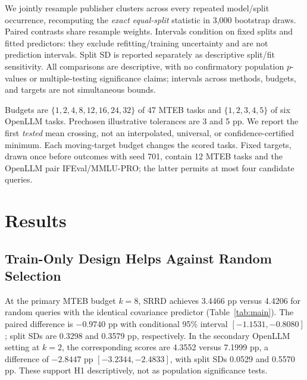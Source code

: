 \documentclass{article}
\begin{document}
We jointly resample publisher clusters across every repeated model/split occurrence, recomputing the \emph{exact equal-split} statistic in 3,000 bootstrap draws. Paired contrasts share resample weights. Intervals condition on fixed splits and fitted predictors: they exclude refitting/training uncertainty and are not prediction intervals. Split SD is reported separately as descriptive split/fit sensitivity. All comparisons are descriptive, with no confirmatory population $p$-values or multiple-testing significance claims; intervals across methods, budgets, and targets are not simultaneous bounds.

Budgets are $\{1,2,4,8,12,16,24,32\}$ of 47 MTEB tasks and $\{1,2,3,4,5\}$ of six OpenLLM tasks. Prechosen illustrative tolerances are 3 and 5 pp. We report the first \emph{tested} mean crossing, not an interpolated, universal, or confidence-certified minimum. Each moving-target budget changes the scored tasks. Fixed targets, drawn once before outcomes with seed 701, contain 12 MTEB tasks and the OpenLLM pair IFEval/MMLU-PRO; the latter permits at most four candidate queries.

\section{Results}
\label{sec:results}
\begin{table}[t]
\caption{Unrun-task mean per-model RMSE (pp), with conditional 95\% publisher-cluster bootstrap intervals in brackets. Lower is better. Random and publisher denote held-out-model split rules, not query policies. The last two rows and low-rank risk design are post-core exploratory frozen-parameter controls. These ten methods vary both selection and prediction; the random-covariance comparison isolates selection policy but still changes unrun target composition.}
\label{tab:main}
\centering

\end{table}

\subsection{Train-Only Design Helps Against Random Selection}
At the primary MTEB budget $k=8$, SRRD achieves 3.4466 pp versus 4.4206 for random queries with the identical covariance predictor (Table~\ref{tab:main}). The paired difference is $-0.9740$ pp with conditional 95\% interval $[-1.1531,-0.8080]$; split SDs are 0.3298 and 0.3579 pp, respectively. In the secondary OpenLLM setting at $k=2$, the corresponding scores are 4.3552 versus 7.1999 pp, a difference of $-2.8447$ pp $[-3.2344,-2.4833]$, with split SDs 0.0529 and 0.5570 pp. These support H1 descriptively, not as population significance tests.
\end{document}
